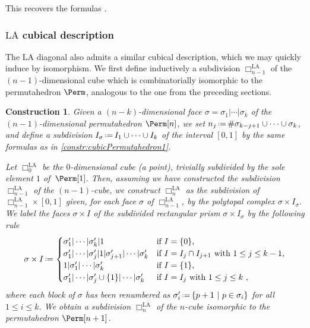 \documentclass{amsart}
\newtheorem{construction}[theorem]{Construction}
\theoremstyle{definition}
\newcommand{\eqdef}{\mbox{\,\raisebox{0.2ex}{\scriptsize\ensuremath{\mathrm:}}\ensuremath{=}\,}} %
\newcommand{\card}[1]{\##1} %
\newcommand{\LA}{\mathrm{LA}}
\newcommand{\divcube}[1]{\Box_{#1}}
\begin{document}
This recovers the formulas \cite[Form.~(1)~\&~(3)]{SaneblidzeUmble-comparingDiagonals}.


\subsubsection{$\LA$ cubical description}

The $\LA$ diagonal also admits a similar cubical description, which we may quickly induce by isomorphism.
We first define inductively a subdivision $\divcube{n-1}^{\LA}$ of the $(n-1)$-dimensional cube which is combinatorially isomorphic to the permutahedron $\Perm$, analogous to the one from the preceding sections. 

\begin{construction}
	\label{const:cubical-LA}
Given a $(n-k)$-dimensional face $\sigma = \sigma_1| \cdots |\sigma_k$ of the $(n-1)$-dimensional permutahedron $\Perm[n]$, we set $n_j \eqdef \card{\sigma_{k-j+1}\cup\dots\cup \sigma_k}$, and define a subdivision $I_\sigma \eqdef I_1 \cup \dots \cup I_k$ of the interval $[0,1]$ by the same formulas as in \cref{constr:cubicPermutahedron1}.

Let $\divcube{0}^\LA$ be the $0$-dimensional cube (a point), trivially subdivided by the sole element $1$ of~$\Perm[1]$.
Then, assuming we have constructed the subdivision $\divcube{n-1}^\LA$ of the $(n-1)$-cube, we construct $\divcube{n}^\LA$ as the subdivision of $\divcube{n-1}^\LA \times [0,1]$ given, for each face $\sigma$ of $\divcube{n-1}^\LA$, by the polytopal complex $\sigma \times I_\sigma$. 
We label the faces $\sigma \times I$ of the subdivided rectangular prism $\sigma \times I_\sigma$ by the following rule
\begin{align*} 
	\sigma \times I \eqdef
	\begin{cases}
		\sigma_1'| \cdots |\sigma_k'| 1 & \text{if } I = \{0\}, \\
		\sigma_1'| \cdots |\sigma_j'| 1 |\sigma_{j+1}'| \cdots |\sigma_k' & \text{if } I = I_j \cap I_{j+1} \text{ with } 1 \leq j \leq k-1 , \\
		1|\sigma_1'| \cdots |\sigma_k'  & \text{if } I = \{1\}, \\
		\sigma_1'| \cdots |\sigma_j' \cup \{1\}| \cdots |\sigma_k' & \text{if } I = I_j \text{ with }  1\leq j \leq k \ , 
	\end{cases} 
\end{align*}
where each block of $\sigma$ has been renumbered as $\sigma_i' \eqdef \{p+1 \ | \ p \in \sigma_i\}$ for all $1 \leq i \leq k$.
We obtain a subdivision $\divcube{n}^\LA$ of the $n$-cube isomorphic to the permutahedron $\Perm[n+1]$.
\end{construction}
\end{document}
